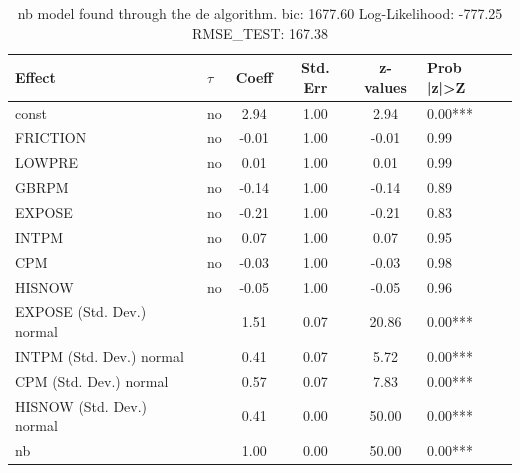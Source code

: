 \begin{table}
	\caption{nb model found through the de algorithm. bic: 1677.60 Log-Likelihood: -777.25 RMSE_TEST: 167.38}
	\begin{center}
		\begin{tabular}{|l|l|c|c|c|l|}
			\hline
			Effect & $\tau$ & Coeff & Std. Err & z-values & Prob |z|>Z \\
			\hline
			const & no & 2.94 & 1.00 & 2.94 & 0.00*** \\
			\hline
			FRICTION & no & -0.01 & 1.00 & -0.01 & 0.99 \\
			\hline
			LOWPRE & no & 0.01 & 1.00 & 0.01 & 0.99 \\
			\hline
			GBRPM & no & -0.14 & 1.00 & -0.14 & 0.89 \\
			\hline
			EXPOSE & no & -0.21 & 1.00 & -0.21 & 0.83 \\
			\hline
			INTPM & no & 0.07 & 1.00 & 0.07 & 0.95 \\
			\hline
			CPM & no & -0.03 & 1.00 & -0.03 & 0.98 \\
			\hline
			HISNOW & no & -0.05 & 1.00 & -0.05 & 0.96 \\
			\hline
			EXPOSE (Std. Dev.) normal &  & 1.51 & 0.07 & 20.86 & 0.00*** \\
			\hline
			INTPM (Std. Dev.) normal &  & 0.41 & 0.07 & 5.72 & 0.00*** \\
			\hline
			CPM (Std. Dev.) normal &  & 0.57 & 0.07 & 7.83 & 0.00*** \\
			\hline
			HISNOW (Std. Dev.) normal &  & 0.41 & 0.00 & 50.00 & 0.00*** \\
			\hline
			nb &  & 1.00 & 0.00 & 50.00 & 0.00*** \\
			\hline
		\end{tabular}
	\end{center}
\end{table}